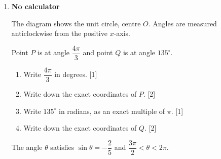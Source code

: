 \documentclass[12pt, twoside]{article}
\begin{document}
\begin{enumerate}[itemsep=0.15cm]

\item[1.] [Maximum mark: 10] \hfill \textbf{No calculator}

\begin{minipage}[t]{0.5\linewidth}
The diagram shows the unit circle, centre $O$. Angles are measured
anticlockwise from the positive $x$-axis.

Point $P$ is at angle $\dfrac{4\pi}{3}$ and point $Q$ is at angle
$135^\circ$.
\end{minipage}
\hfill
\begin{minipage}[t]{0.46\linewidth}
\vspace{0pt}
\centering
{}
\end{minipage}

\begin{enumerate}[itemsep=0.1cm]
  \item Write $\dfrac{4\pi}{3}$ in degrees. \hfill [1]
  \item Write down the exact coordinates of $P$. \hfill [2]
  \item Write $135^\circ$ in radians, as an exact multiple of $\pi$.
  \hfill [1]
  \item Write down the exact coordinates of $Q$. \hfill [2]
\end{enumerate}

The angle $\theta$ satisfies $\sin\theta = -\dfrac{2}{5}$ and
$\dfrac{3\pi}{2} < \theta < 2\pi$.


\end{enumerate}
\end{document}
